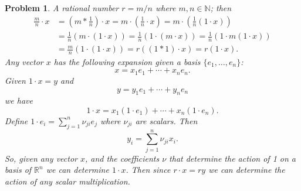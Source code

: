 \documentclass{article}
\theoremstyle{pprop}
\newtheorem{problem}{Problem}[section]
\begin{document}
\begin{problem}
A rational number $r=m/n$ where $m,n \in \mathbb{N}$; then
\begin{align*}
\frac{m}{n}\cdot x & = \left( m * \frac{1}{n} \right) \cdot x =m \cdot \left(  \frac{1}{n} \cdot x\right)=m \cdot \left(\frac{1}{n} (1\cdot x)  \right) \\
& =\frac{1}{n}\left(m \cdot (1 \cdot x)\right)=\frac{1}{n}\left(1 \cdot (m \cdot x)\right)=\frac{1}{n}\left( 1 \cdot m (1\cdot x) \right)\\
& =\frac{m}{n}(1\cdot(1\cdot x))=r((1*1)\cdot x)=r(1 \cdot x).
\end{align*}
Any vector $x$ has the following expansion given a basis $\{e_1,\ldots,e_n\}$:
$$
x= x_1 e_1 + \cdots + x_n e_n.
$$
Given $1\cdot x =y$ and 
$$
y=y_1 e_1 + \cdots + y_n e_n
$$
we have 
$$
1\cdot x = x_1 (1\cdot e_1)+\cdots+x_n (1\cdot e_n).
$$
Define $1 \cdot e_i = \sum_{j=1}^n \nu_{ji} e_j$ where $\nu_{ji}$ are scalars. Then 
$$
y_i = \sum_{j=1}^n \nu_{ji}x_i.
$$
So, given any vector $x$, and the coefficients $\nu$ that determine the action of 1 on a basis of $\mathbb{R}^n$ we 
can determine $1 \cdot x$.  Then since $r \cdot x=r y$ we can determine the action of any scalar multiplication.
\end{problem}
\end{document}
